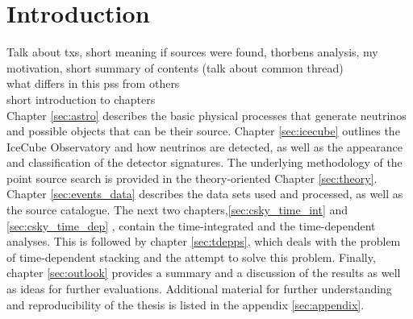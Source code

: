 \chapter{Introduction}
Talk about txs, short meaning if sources were found, thorbens analysis, my motivation, short summary of contents (talk about common thread)\\

what differs in this pss from others\\
short introduction to chapters\\

Chapter \ref{sec:astro} describes the basic physical processes that generate neutrinos and possible objects that can be their source.
Chapter \ref{sec:icecube} outlines the IceCube Observatory and how neutrinos are detected, as well as the appearance and classification of the detector signatures.
The underlying methodology of the point source search is provided in the theory-oriented Chapter \ref{sec:theory}.
Chapter \ref{sec:events_data} describes the data sets used and processed, as well as the source catalogue.
The next two chapters,\ref{sec:csky_time_int} and \ref{sec:csky_time_dep} , contain the time-integrated and the time-dependent analyses.
This is followed by chapter \ref{sec:tdepps}, which deals with the problem of time-dependent stacking and the attempt to solve this problem.
Finally, chapter \ref{sec:outlook} provides a summary and a discussion of the results as well as ideas for further evaluations.
Additional material for further understanding and reproducibility of the thesis is listed in the appendix \ref{sec:appendix}.
